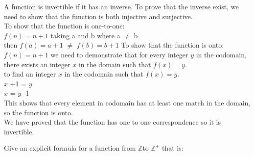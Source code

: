 \documentclass[a4paper]{exam}
\theoremstyle{definition}
\newcommand\Z{\ensuremath{\mathbb{Z}}}
\begin{document}
\begin{questions}
  \begin{solution}
    
    A function is invertible if it has an inverse. To prove that the inverse exist, we need to show that the function is both injective and surjective.\\
    To show that the function is one-to-one:\\
    \(f(n) = n+1\) taking a and b where a $\not =$ b\\
    then \(f(a) = a+1\) $\not =$ \(f(b) = b+1\)
    To show that the function is onto:\\
    \(f(n) = n+1\) we need to demonstrate that for every integer $y$ in the codomain, there exists an integer $x$ in the domain such that $f(x)=y$.\\
    to find an integer $x$ in the codomain such that $f(x)=y$.\\
    $x$ +1 = $y$\\
    $x$ = $y$ -1\\
    This shows that every element in codomain has at least one match in the domain, so the function is onto.\\
    We have proved that the function has one to one correspondence so it is invertible.
     
  \end{solution}
  
\question Give an explicit formula for a function from \Z to $\Z^+$ that is:
\end{questions}
\end{document}
